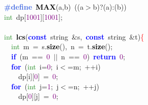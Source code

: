 
{\ttfamily \raggedright {
\noindent
\mbox{}\textbf{\textcolor{RoyalBlue}{\#define}}\ \textbf{\textcolor{Black}{MAX}}\textcolor{BrickRed}{(}a\textcolor{BrickRed}{,}b\textcolor{BrickRed}{)}\ \textcolor{BrickRed}{((}a\textcolor{BrickRed}{$>$}b\textcolor{BrickRed}{)?(}a\textcolor{BrickRed}{):(}b\textcolor{BrickRed}{))} \\
\mbox{}\textcolor{ForestGreen}{int}\ dp\textcolor{BrickRed}{[}\textcolor{Purple}{1001}\textcolor{BrickRed}{][}\textcolor{Purple}{1001}\textcolor{BrickRed}{];} \\
\mbox{} \\
\mbox{}\textcolor{ForestGreen}{int}\ \textbf{\textcolor{Black}{lcs}}\textcolor{BrickRed}{(}\textbf{\textcolor{Blue}{const}}\ string\ \textcolor{BrickRed}{\&}s\textcolor{BrickRed}{,}\ \textbf{\textcolor{Blue}{const}}\ string\ \textcolor{BrickRed}{\&}t\textcolor{BrickRed}{)}\textcolor{Red}{\{} \\
\mbox{}\ \ \textcolor{ForestGreen}{int}\ m\ \textcolor{BrickRed}{=}\ s\textcolor{BrickRed}{.}\textbf{\textcolor{Black}{size}}\textcolor{BrickRed}{(),}\ n\ \textcolor{BrickRed}{=}\ t\textcolor{BrickRed}{.}\textbf{\textcolor{Black}{size}}\textcolor{BrickRed}{();} \\
\mbox{}\ \ \textbf{\textcolor{Blue}{if}}\ \textcolor{BrickRed}{(}m\ \textcolor{BrickRed}{==}\ \textcolor{Purple}{0}\ \textcolor{BrickRed}{$|$$|$}\ n\ \textcolor{BrickRed}{==}\ \textcolor{Purple}{0}\textcolor{BrickRed}{)}\ \textbf{\textcolor{Blue}{return}}\ \textcolor{Purple}{0}\textcolor{BrickRed}{;} \\
\mbox{}\ \ \textbf{\textcolor{Blue}{for}}\ \textcolor{BrickRed}{(}\textcolor{ForestGreen}{int}\ i\textcolor{BrickRed}{=}\textcolor{Purple}{0}\textcolor{BrickRed}{;}\ i\textcolor{BrickRed}{$<$=}m\textcolor{BrickRed}{;}\ \textcolor{BrickRed}{++}i\textcolor{BrickRed}{)} \\
\mbox{}\ \ \ \ dp\textcolor{BrickRed}{[}i\textcolor{BrickRed}{][}\textcolor{Purple}{0}\textcolor{BrickRed}{]}\ \textcolor{BrickRed}{=}\ \textcolor{Purple}{0}\textcolor{BrickRed}{;} \\
\mbox{}\ \ \textbf{\textcolor{Blue}{for}}\ \textcolor{BrickRed}{(}\textcolor{ForestGreen}{int}\ j\textcolor{BrickRed}{=}\textcolor{Purple}{1}\textcolor{BrickRed}{;}\ j\textcolor{BrickRed}{$<$=}n\textcolor{BrickRed}{;}\ \textcolor{BrickRed}{++}j\textcolor{BrickRed}{)} \\
\mbox{}\ \ \ \ dp\textcolor{BrickRed}{[}\textcolor{Purple}{0}\textcolor{BrickRed}{][}j\textcolor{BrickRed}{]}\ \textcolor{BrickRed}{=}\ \textcolor{Purple}{0}\textcolor{BrickRed}{;} \\
}}
